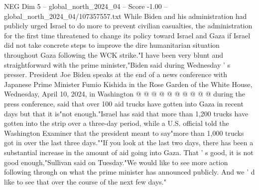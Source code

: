 \begin{textsample}{NEG Dim 5 – global\_north\_2024\_04 – Score -1.00 – global\_north\_2024\_04/107357557.txt}
While Biden and his administration had publicly urged Israel to do more to prevent civilian casualties, the administration for the first time threatened to change its policy toward Israel and Gaza if Israel did not take concrete steps to improve the dire humanitarian situation throughout Gaza following the WCK strike."I have been very blunt and straightforward with the prime minister,"Biden said during Wednesday ' s presser.
President Joe Biden speaks at the end of a news conference with Japanese Prime Minister Fumio Kishida in the Rose Garden of the White House, Wednesday, April 10, 2024, in Washington @ @ @ @ @ @ @ @ @ @ during the press conference, said that over 100 aid trucks have gotten into Gaza in recent days but that it is"not enough."Israel has said that more than 1,200 trucks have gotten into the strip over a three-day period, while a U.S. official told the Washington Examiner that the president meant to say"more than 1,000 trucks got in over the last three days.""If you look at the last two days, there has been a substantial increase in the amount of aid going into Gaza.
That ' s good, it is not good enough,"Sullivan said on Tuesday."We would like to see more action following through on what the prime minister has announced publicly.
And we ' d like to see that over the course of the next few days."

\end{textsample}
